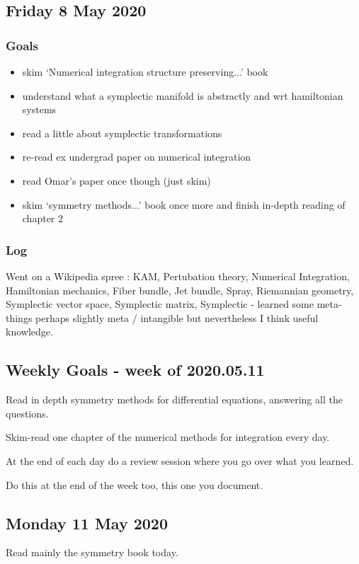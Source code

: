 \documentclass[12pt]{article}
\begin{document}
\subsection{Friday 8 May 2020}
\subsubsection{Goals}
\begin{itemize}
    \item skim `Numerical integration structure preserving...' book
    \item understand what a symplectic manifold is abstractly and wrt hamiltonian systems
    \item read a little about symplectic transformations
    \item re-read ex undergrad paper on numerical integration
    \item read Omar's paper once though (just skim)
    \item skim `symmetry methods...' book once more and finish in-depth reading of chapter 2
\end{itemize}

\subsubsection{Log}
Went on a Wikipedia spree : KAM, Pertubation theory, Numerical Integration, Hamiltonian mechanics, Fiber bundle, Jet bundle, Spray, Riemannian geometry, Symplectic vector space, Symplectic matrix, Symplectic - learned some meta-things perhaps slightly meta / intangible but nevertheless I think useful knowledge. 


\subsection{Weekly Goals - week of 2020.05.11}
Read in depth symmetry methods for differential equations, answering all the questions. 

Skim-read one chapter of the numerical methods for integration every day. 

At the end of each day do a review session where you go over what you learned. 

Do this at the end of the week too, this one you document. 

\subsection{Monday 11 May 2020}
Read mainly the symmetry book today. 
\end{document}
